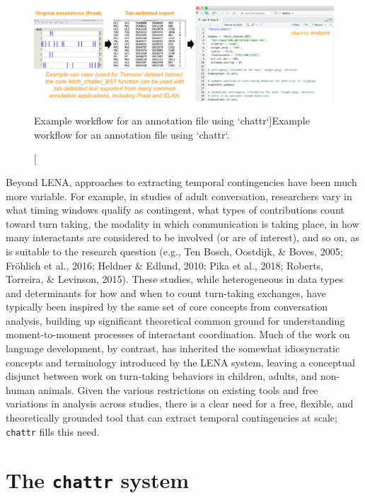 \documentclass[10pt, letterpaper]{article}
\newenvironment{CodeChunk}{}{}
\begin{document}
\begin{CodeChunk}
\begin{figure}[h]

{\centering \includegraphics{figs/workflow-1} 

}

\caption[Example workflow for an annotation file using `chattr`]{Example workflow for an annotation file using `chattr`.}\label{fig:workflow}
\end{figure}
\end{CodeChunk}

Beyond LENA, approaches to extracting temporal contingencies have been
much more variable. For example, in studies of adult conversation,
researchers vary in what timing windows qualify as contingent, what
types of contributions count toward turn taking, the modality in which
communication is taking place, in how many interactants are considered
to be involved (or are of interest), and so on, as is suitable to the
research question (e.g., Ten Bosch, Oostdijk, \& Boves, 2005; Fröhlich
et al., 2016; Heldner \& Edlund, 2010; Pika et al., 2018; Roberts,
Torreira, \& Levinson, 2015). These studies, while heterogeneous in data
types and determinants for how and when to count turn-taking exchanges,
have typically been inspired by the same set of core concepts from
conversation analysis, building up significant theoretical common ground
for understanding moment-to-moment processes of interactant
coordination. Much of the work on language development, by contrast, has
inherited the somewhat idiosyncratic concepts and terminology introduced
by the LENA system, leaving a conceptual disjunct between work on
turn-taking behaviors in children, adults, and non-human animals. Given
the various restrictions on existing tools and free variations in
analysis across studies, there is a clear need for a free, flexible, and
theoretically grounded tool that can extract temporal contingencies at
scale; \texttt{chattr} fills this need.

\hypertarget{the-chattr-system}{%
\section{\texorpdfstring{The \texttt{chattr}
system}{The chattr system}}\label{the-chattr-system}}
\end{document}
